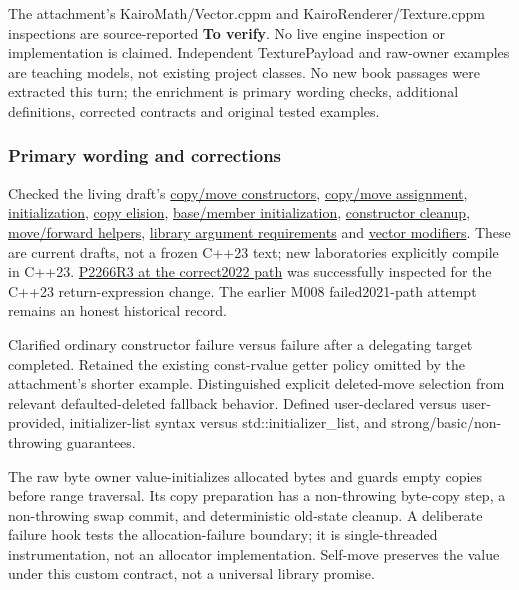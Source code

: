 The attachment's KairoMath/Vector.cppm and KairoRenderer/Texture.cppm inspections are source-reported \textbf{To verify}. No live engine inspection or implementation is claimed. Independent TexturePayload and raw-owner examples are teaching models, not existing project classes. No new book passages were extracted this turn; the enrichment is primary wording checks, additional definitions, corrected contracts and original tested examples.

\subsubsection{Primary wording and corrections}\label{appendix-a103e7846d21-primary-wording-and-corrections}

\hypertarget{appendix-a103e7846d21-primary-wording-and-corrections}{}

Checked the living draft's \href{https://eel.is/c++draft/class.copy.ctor}{copy/move constructors}, \href{https://eel.is/c++draft/class.copy.assign}{copy/move assignment}, \href{https://eel.is/c++draft/dcl.init}{initialization}, \href{https://eel.is/c++draft/class.copy.elision}{copy elision}, \href{https://eel.is/c++draft/class.base.init}{base/member initialization}, \href{https://eel.is/c++draft/except.ctor}{constructor cleanup}, \href{https://eel.is/c++draft/forward}{move/forward helpers}, \href{https://eel.is/c++draft/utility.arg.requirements}{library argument requirements} and \href{https://eel.is/c++draft/vector.modifiers}{vector modifiers}. These are current drafts, not a frozen C++23 text; new laboratories explicitly compile in C++23. \href{https://www.open-std.org/jtc1/sc22/wg21/docs/papers/2022/p2266r3.html}{P2266R3 at the correct2022 path} was successfully inspected for the C++23 return-expression change. The earlier M008 failed2021-path attempt remains an honest historical record.

Clarified ordinary constructor failure versus failure after a delegating target completed. Retained the existing const-rvalue getter policy omitted by the attachment's shorter example. Distinguished explicit deleted-move selection from relevant defaulted-deleted fallback behavior. Defined user-declared versus user-provided, initializer-list syntax versus std::initializer\_list, and strong/basic/non-throwing guarantees.

The raw byte owner value-initializes allocated bytes and guards empty copies before range traversal. Its copy preparation has a non-throwing byte-copy step, a non-throwing swap commit, and deterministic old-state cleanup. A deliberate failure hook tests the allocation-failure boundary; it is single-threaded instrumentation, not an allocator implementation. Self-move preserves the value under this custom contract, not a universal library promise.

